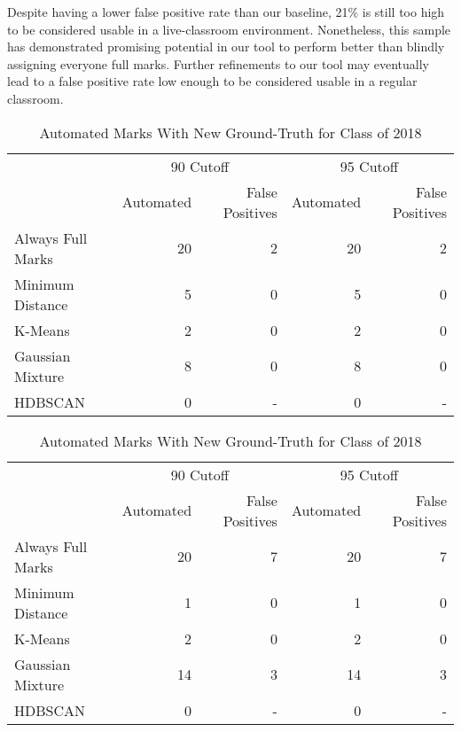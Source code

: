Despite having a lower false positive rate than our baseline, 21\% is still too high to be considered usable in a live-classroom environment. Nonetheless, this sample has demonstrated promising potential in our tool to perform better than blindly assigning everyone full marks. Further refinements to our tool may eventually lead to a false positive rate low enough to be considered usable in a regular classroom.

\begin{table}
\caption{Automated Marks With New Ground-Truth for Class of 2017}
\label{tab:ctm-remarked-w2017}
\begin{tabular}{lrrrr} \toprule
\multirow{2}{*}{}
& \multicolumn{2}{c}{90 Cutoff} & \multicolumn{2}{c}{95 Cutoff}  \\
& Automated & False Positives & Automated & False Positives  \\
\midrule
Always Full Marks & 20 & 2 & 20 & 2 \\
Minimum Distance  & 5  & 0 & 5  & 0 \\
K-Means           & 2  & 0 & 2  & 0 \\
Gaussian Mixture  & 8  & 0 & 8  & 0 \\
HDBSCAN           & 0  & - & 0  & - \\
\bottomrule
\end{tabular}

\caption{Automated Marks With New Ground-Truth for Class of 2018}
\label{tab:ctm-remarked-w2018}
\begin{tabular}{lrrrr} \toprule
\multirow{2}{*}{}
& \multicolumn{2}{c}{90 Cutoff} & \multicolumn{2}{c}{95 Cutoff}  \\
& Automated & False Positives & Automated & False Positives  \\
\midrule
Always Full Marks & 20 & 7 & 20 & 7 \\
Minimum Distance  & 1  & 0 & 1  & 0 \\
K-Means           & 2  & 0 & 2  & 0 \\
Gaussian Mixture  & 14 & 3 & 14 & 3 \\
HDBSCAN           & 0  & - & 0  & - \\
\bottomrule
\end{tabular}
\end{table}
